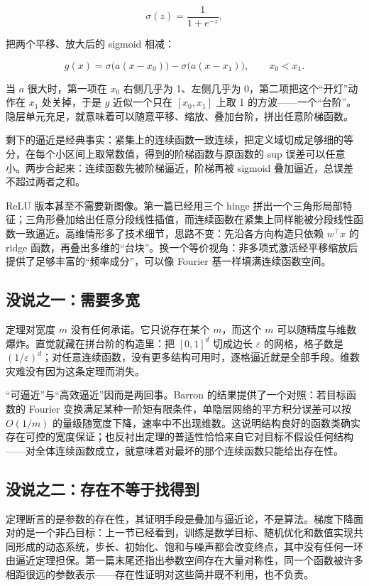 \[
\sigma(z)=\frac1{1+e^{-z}},
\]

把两个平移、放大后的 sigmoid 相减：

\[
g(x)=\sigma\bigl(a(x-x_0)\bigr)-\sigma\bigl(a(x-x_1)\bigr),
\qquad x_0<x_1.
\]

当 \(a\) 很大时，第一项在 \(x_0\) 右侧几乎为 1、左侧几乎为 0，第二项把这个``开灯''动作在 \(x_1\) 处关掉，于是 \(g\) 近似一个只在 \([x_0,x_1]\) 上取 1 的方波——一个``台阶''。隐层单元充足，就意味着可以随意平移、缩放、叠加台阶，拼出任意阶梯函数。

剩下的逼近是经典事实：紧集上的连续函数一致连续，把定义域切成足够细的等分，在每个小区间上取常数值，得到的阶梯函数与原函数的 sup 误差可以任意小。两步合起来：连续函数先被阶梯逼近，阶梯再被 sigmoid 叠加逼近，总误差不超过两者之和。

ReLU 版本甚至不需要新图像。第一篇已经用三个 hinge 拼出一个三角形局部特征；三角形叠加给出任意分段线性插值，而连续函数在紧集上同样能被分段线性函数一致逼近。高维情形多了技术细节，思路不变：先沿各方向构造只依赖 \(w^\top x\) 的 ridge 函数，再叠出多维的``台块''。换一个等价视角：非多项式激活经平移缩放后提供了足够丰富的``频率成分''，可以像 Fourier 基一样填满连续函数空间。

\subsection{没说之一：需要多宽}

定理对宽度 \(m\) 没有任何承诺。它只说存在某个 \(m\)，而这个 \(m\) 可以随精度与维数爆炸。直觉就藏在拼台阶的构造里：把 \([0,1]^d\) 切成边长 \(\varepsilon\) 的网格，格子数是 \((1/\varepsilon)^d\)；对任意连续函数，没有更多结构可用时，逐格逼近就是全部手段。维数灾难没有因为这条定理而消失。

``可逼近''与``高效逼近''因而是两回事。Barron 的结果提供了一个对照：若目标函数的 Fourier 变换满足某种一阶矩有限条件，单隐层网络的平方积分误差可以按 \(O(1/m)\) 的量级随宽度下降，速率中不出现维数。这说明结构良好的函数类确实存在可控的宽度保证；也反衬出定理的普适性恰恰来自它对目标不假设任何结构——对全体连续函数成立，就意味着对最坏的那个连续函数只能给出存在性。

\subsection{没说之二：存在不等于找得到}

定理断言的是参数的存在性，其证明手段是叠加与逼近论，不是算法。梯度下降面对的是一个非凸目标：上一节已经看到，训练是数学目标、随机优化和数值实现共同形成的动态系统，步长、初始化、饱和与噪声都会改变终点，其中没有任何一环由逼近定理担保。第一篇末尾还指出参数空间存在大量对称性，同一个函数被许多相距很远的参数表示——存在性证明对这些简并既不利用，也不负责。

